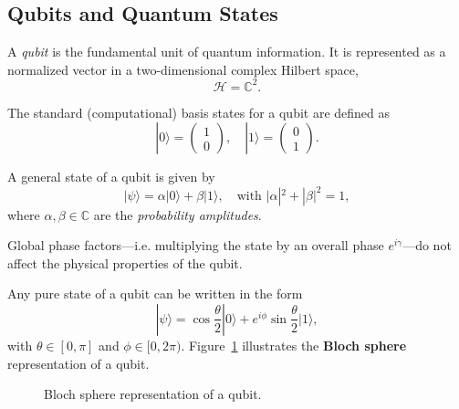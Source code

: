 

\subsection{Qubits and Quantum States}
\label{subsec:qubits}

\begin{definition}[Qubit]
A \emph{\gls{qubit}} is the fundamental unit of quantum information. It is represented as a normalized vector in a two-dimensional complex Hilbert space,
\[
\mathcal{H} = \mathbb{C}^2.
\]
\end{definition}

\begin{notation}
The standard (computational) basis states for a qubit are defined as
\[
|0\rangle = \begin{pmatrix} 1 \\ 0 \end{pmatrix}, \quad |1\rangle = \begin{pmatrix} 0 \\ 1 \end{pmatrix}.
\]
\end{notation}

\begin{definition}
A general state of a \gls{qubit} is given by
\[
|\psi\rangle = \alpha|0\rangle + \beta|1\rangle, \quad \text{with } |\alpha|^2 + |\beta|^2 = 1,
\]
where \(\alpha,\beta \in \mathbb{C}\) are the \emph{probability amplitudes}.
\end{definition}

\begin{remark}
Global phase factors—i.e. multiplying the state by an overall phase \(e^{i\gamma}\)—do not affect the physical properties of the qubit.
\end{remark}

\begin{example}
Any pure state of a \gls{qubit} can be written in the form
\[
|\psi\rangle = \cos\frac{\theta}{2}|0\rangle + e^{i\phi}\sin\frac{\theta}{2}|1\rangle,
\]
with \(\theta \in [0,\pi]\) and \(\phi \in [0,2\pi)\). Figure~\ref{fig:bloch_sphere} illustrates the \textbf{Bloch sphere} representation of a qubit.
\end{example}

\begin{figure}[h]
\centering
{}
\caption{Bloch sphere representation of a \gls{qubit}.}
\label{fig:bloch_sphere}
\end{figure}

